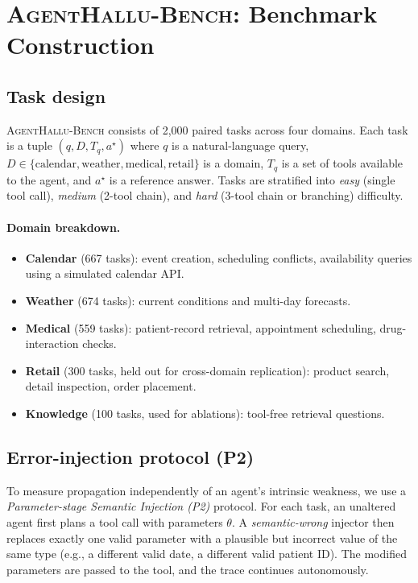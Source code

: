 \documentclass[11pt]{article}
\newcommand{\halluben}{\textsc{AgentHallu-Bench}}
\begin{document}
\section{\halluben{}: Benchmark Construction}
\label{sec:bench}

\subsection{Task design}
\halluben{} consists of 2{,}000 paired tasks across four domains. Each task is a tuple $(q, D, T_q, a^\star)$ where $q$ is a natural-language query, $D \in \{\text{calendar}, \text{weather}, \text{medical}, \text{retail}\}$ is a domain, $T_q$ is a set of tools available to the agent, and $a^\star$ is a reference answer. Tasks are stratified into \emph{easy} (single tool call), \emph{medium} (2-tool chain), and \emph{hard} (3-tool chain or branching) difficulty.

\paragraph{Domain breakdown.}
\begin{itemize}
  \item \textbf{Calendar} (667 tasks): event creation, scheduling conflicts, availability queries using a simulated calendar API.
  \item \textbf{Weather} (674 tasks): current conditions and multi-day forecasts.
  \item \textbf{Medical} (559 tasks): patient-record retrieval, appointment scheduling, drug-interaction checks.
  \item \textbf{Retail} (300 tasks, held out for cross-domain replication): product search, detail inspection, order placement.
  \item \textbf{Knowledge} (100 tasks, used for ablations): tool-free retrieval questions.
\end{itemize}

\subsection{Error-injection protocol (P2)}
To measure propagation independently of an agent's intrinsic weakness, we use a \emph{Parameter-stage Semantic Injection (P2)} protocol. For each task, an unaltered agent first plans a tool call with parameters $\theta$. A \emph{semantic-wrong} injector then replaces exactly one valid parameter with a plausible but incorrect value of the same type (e.g., a different valid date, a different valid patient ID). The modified parameters are passed to the tool, and the trace continues autonomously.
\end{document}
